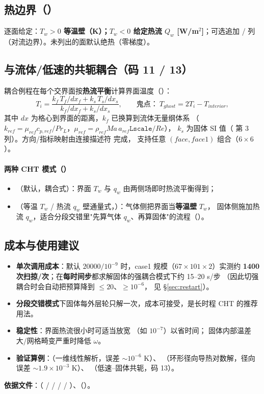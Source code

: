 \subsection{热边界（）}
逐面给定：\textbf{$T_w>0$ 等温壁（K）；$T_w<0$ 给定热流 $Q_w$ [W/m$^2$]}；可选追加
/ 列（对流边界）。未列出的面默认绝热（零梯度）。

\subsection{与流体/低速的共轭耦合（码 11 / 13）}
耦合例程在每个交界面按\textbf{热流平衡}计算界面温度（）：
\begin{equation}
T_i=\frac{k_f\,T_f/dx_f + k_s\,T_s/dx_s}{k_f/dx_f + k_s/dx_s},
\qquad
\text{鬼点：}\ T_{ghost}=2T_i-T_{interior},
\end{equation}
其中 $dx$ 为格心到界面的距离，$k_f$ 已换算到流体无量纲体系
（$k_{ref}=\mu_{ref}c_{p,ref}/Pr_L$，$\mu_{ref}=\rho_{ref}Ma\,a_{ref}\texttt{Lscale}/Re$），
$k_s$ 为固体 SI 值（ 第 3 列）。方向/指标映射由连接描述符  完成，
支持任意 $(face,face1)$ 组合（$6\times6$）。

\paragraph{两种 CHT 模式（）}
\begin{itemize}
  \item {}（默认，耦合式）：界面 $T_w$ 与 $q_w$ 由两侧场即时热流平衡得到；
  \item {}（等温 $T_w$ / 热流 $q_w$ 壁通量式，）：气体侧把界面当\textbf{等温壁} $T_w$，
        固体侧施加热流 $q_w$，适合分段交错里"先算气体 $q_w$、再算固体"的流程（）。
\end{itemize}

\subsection{成本与使用建议}
\begin{itemize}
  \item \textbf{单次调用成本}：默认 $20000/10^{-9}$ 时，case1 规模（$67\times101\times2$）实测约
        \textbf{1400 次扫掠/次}；在\textbf{每时间步}都求解固体的强耦合模式下约 15--20 s/步
        （因此切强耦合时会自动把预算降到 $\le20$、$\ge10^{-6}$，
        见 \S\ref{sec:restart}）。
  \item \textbf{分段交错模式}下固体每外层轮只解一次，成本可接受，是长时程 CHT 的推荐用法。
  \item \textbf{稳定性}：界面热流很小时可适当放宽 （如 $10^{-7}$）以省时间；
        固体内部温差大/网格畸变严重时降低 $\omega$。
  \item \textbf{验证算例}：（一维线性解析，误差 $\sim10^{-6}$ K）、
        （环形径向导热对数解，径向误差 $\sim1.9\times10^{-3}$ K）、
        （低速--固体共轭，码 13）。
\end{itemize}

\noindent\textbf{依据文件}：（ /
 /  /
 / ）、（）。
